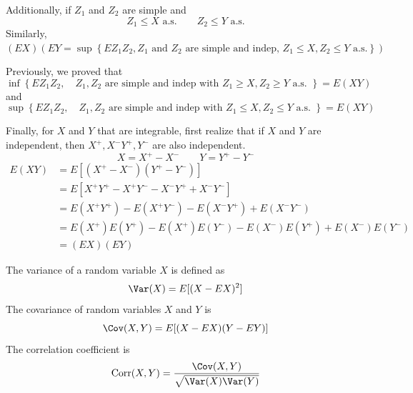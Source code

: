 Additionally, if $Z_1$ and $Z_2$ are simple and 
\[Z_1 \leq X \text{ a.s.} \qquad Z_2 \leq Y \text{ a.s.}\]
Similarly, $(EX)(EY = \sup\left\{EZ_1Z_2, Z_1 \text{ and }Z_2 \text{ are simple and indep, }Z_1 \leq X, Z_2 \leq Y \text{ a.s.}\right\})$


Previously, we proved that
\[\inf\left\{EZ_1Z_2, \quad Z_1, Z_2 \text{ are simple and indep with }Z_1 \geq X, Z_2 \geq Y \text{ a.s. }\right\} = E(XY)\]
and
\[\sup\left\{EZ_1Z_2, \quad Z_1, Z_2 \text{ are simple and indep with }Z_1 \leq X, Z_2 \leq Y \text{ a.s. }\right\} = E(XY)\]


Finally, for $X$ and $Y$ that are integrable, first realize that if $X$ and $Y$ are independent, then $X^+, X^- Y^+, Y^-$ are also independent.
\[X = X^+ - X^- \qquad Y = Y^+ - Y^-\]
\begin{align*}
    E(XY) &= E[(X^+ - X^-)(Y^+ - Y^-)]\\
    &=E[X^+Y^+ - X^+ Y^- - X^- Y^+ + X^- Y^-]\\
    &= E(X^+Y^+) - E(X^+Y^-) - E(X^- Y^+) + E(X^- Y^-)\\
    &= E(X^+)E(Y^+) - E(X^+)E(Y^-) - E(X^-)E(Y^+) + E(X^-)E(Y^-)\\
    &=(EX)(EY)
\end{align*}

\begin{definition}
    The variance of a random variable $X$ is defined as
    \[\Var(X) = E[(X-EX)^2]\]
    The covariance of random variables $X$ and $Y$ is 
    \[\Cov(X,Y) = E[(X-EX)(Y-EY)]\]
    The correlation coefficient is
    \[\text{Corr}(X,Y) = \frac{\Cov(X,Y)}{\sqrt{\Var(X)\Var(Y)}}\]
\end{definition}
